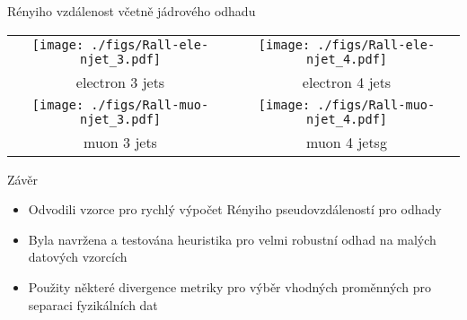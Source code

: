 \documentclass[11pt]{beamer}
\begin{document}
  \begin{frame}{Rényiho vzdálenost včetně jádrového odhadu}
    \vspace{-.2cm}
    \begin{center}
      \begin{tabular}{cc}{\footnotesize}
	\texttt{[image: ./figs/Rall-ele-njet\_3.pdf]}& 
	\texttt{[image: ./figs/Rall-ele-njet\_4.pdf]}\\
	\footnotesize electron 3 jets&
	\footnotesize electron 4 jets\\
	\texttt{[image: ./figs/Rall-muo-njet\_3.pdf]}&
	\texttt{[image: ./figs/Rall-muo-njet\_4.pdf]}\\
	\footnotesize muon 3 jets&
	\footnotesize muon 4 jetsg
      \end{tabular}
    \end{center}
  \end{frame}

\begin{frame}{Závěr}
\begin{itemize}
\item Odvodili vzorce pro rychlý výpočet Rényiho pseudovzdáleností pro odhady
\item Byla navržena a testována heuristika pro velmi robustní odhad na malých datových vzorcích
\item Použity některé divergence metriky pro výběr vhodných proměnných pro separaci fyzikálních dat
\end{itemize}
\end{frame}
\end{document}

